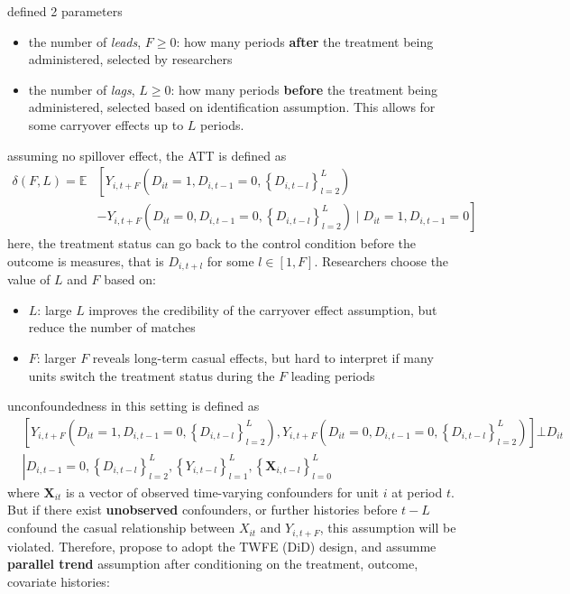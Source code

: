 \documentclass[twoside]{article}
\begin{document}
\citet{imai2023matching} defined 2 parameters
\begin{itemize}
    \item the number of \textit{leads}, $F\geq 0$: how many periods \textbf{after} the treatment being administered, selected by researchers
    \item the number of \textit{lags}, $L\geq 0$: how many periods \textbf{before} the treatment being administered, selected based on identification assumption. This allows for some carryover effects up to $L$ periods.
\end{itemize}
assuming no spillover effect, the ATT is defined as 
\begin{align*}
    \delta\left(F,L\right) = \mathbb{E}&\left[ Y_{i,t+F}\left(D_{it}=1,D_{i,t-1}=0,\left\{D_{i,t-l}\right\}^L_{l=2}\right) \right.\\
    &\left. - Y_{i,t+F}\left(D_{it}=0,D_{i,t-1}=0,\left\{D_{i,t-l}\right\}^L_{l=2}\right) \mid D_{it}=1,D_{i,t-1}=0 \right]
\end{align*}
here, the treatment status can go back to the control condition before the outcome is measures, that is $D_{i,t+l}$ for some $l\in\left[1,F\right]$.
Researchers choose the value of $L$ and $F$ based on:
\begin{itemize}
    \item $L$: large $L$ improves the credibility of the carryover effect assumption, but reduce the number of matches
    \item $F$: larger $F$ reveals long-term casual effects, but hard to interpret if many units switch the treatment status during the $F$ leading periods
\end{itemize}
unconfoundedness in this setting is defined as 
\begin{align*}
    &\left[ Y_{i,t+F}\left(D_{it}=1,D_{i,t-1}=0,\left\{D_{i,t-l}\right\}^L_{l=2}\right), Y_{i,t+F}\left(D_{it}=0,D_{i,t-1}=0,\left\{D_{i,t-l}\right\}^L_{l=2}\right) \right] \bot D_{it}\\
    & \left\vert D_{i,t-1}=0,\left\{D_{i,t-l}\right\}^L_{l=2},\left\{Y_{i,t-l}\right\}^L_{l=1},\left\{\mathbf{X}_{i,t-l}\right\}^L_{l=0} \right.
\end{align*}
where $\mathbf{X}_{it}$ is a vector of observed time-varying confounders for unit $i$ at period $t$. But if there exist \textbf{unobserved} confounders, or further histories before $t-L$ confound the casual relationship between $X_{it}$ and $Y_{i,t+F}$, this assumption will be violated.
Therefore, \citet{imai2023matching} propose to adopt the TWFE (DiD) design, and assumme \textbf{parallel trend} assumption after conditioning on the treatment, outcome, covariate histories:
\end{document}
